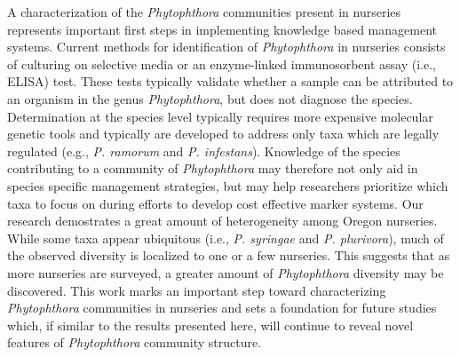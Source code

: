 \documentclass[12pt]{article}
\begin{document}

% 









A characterization of the \emph{Phytophthora} communities present in nurseries represents important first steps in implementing knowledge based management systems.  Current methods for identification of \emph{Phytophthora} in nurseries consists of culturing on selective media \cite{jeffers_martin_1986} or an enzyme-linked immunosorbent assay (i.e., ELISA) test.  These tests typically validate whether a sample can be attributed to an organism in the genus \emph{Phytophthora}, but does not diagnose the species.  Determination at the species level typically requires more expensive molecular genetic tools \cite{grunwald_etal_2011} and typically are developed to address only taxa which are legally regulated (e.g., \emph{P. ramorum} and \emph{P. infestans}).  Knowledge of the species contributing to a community of \emph{Phytophthora} may therefore not only aid in species specific management strategies, but may help researchers prioritize which taxa to focus on during efforts to develop cost effective marker systems.  Our research demostrates a great amount of heterogeneity among Oregon nurseries.  While some taxa appear ubiquitous (i.e., \emph{P. syringae} and \emph{P. plurivora}), much of the observed diversity is localized to one or a few nurseries.  This suggests that as more nurseries are surveyed, a greater amount of \emph{Phytophthora} diversity may be discovered.  This work marks an important step toward characterizing \emph{Phytophthora} communities in nurseries and sets a foundation for future studies which, if similar to the results presented here, will continue to reveal novel features of \emph{Phytophthora} community structure.
\end{document}

